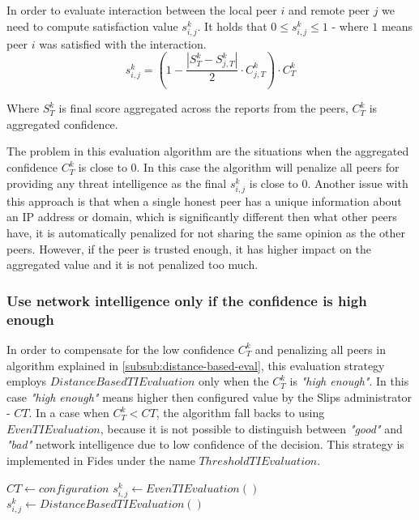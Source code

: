 In order to evaluate interaction between the local peer $i$ and remote peer $j$ we need to compute satisfaction value $s^{k}_{i, j}$. 
It holds that  $0 \leq s^{k}_{i, j} \leq 1$ - where $1$ means peer $i$ was satisfied with the interaction.
\begin{equation}
s^{k}_{i, j} = (1 - \frac{|{S}^{k}_{T} - S^{k}_{j, T}|}{2} \cdot C^{k}_{j, T}) \cdot C^{k}_{T}
\end{equation}

Where $S^{k}_{T}$ is final score aggregated across the reports from the peers, $C^{k}_{T}$ is aggregated confidence.

The problem in this evaluation algorithm are the situations when the aggregated confidence $C^{k}_{T}$ is close to $0$. In this case the algorithm will penalize all peers for providing any threat intelligence as the final $s^{k}_{i, j}$ is close to $0$. Another issue with this approach is that when a single honest peer has a unique information about an IP address or domain, which is significantly different then what other peers have, it is automatically penalized for not sharing the same opinion as the other peers. However, if the peer is trusted enough, it has higher impact on the aggregated value and it is not penalized too much.

\subsubsection{Use network intelligence only if the confidence is high enough}
In order to compensate for the low confidence $C^{k}_{T}$ and penalizing all peers in algorithm explained in \ref{subsub:distance-based-eval}, this evaluation strategy employs $DistanceBasedTIEvaluation$ only when the $C^{k}_{T}$ is \textit{"high enough"}. In this case \textit{"high enough"} means higher then configured value by the Slips administrator - ${CT}$. In a case when  $C^{k}_{T} < {CT}$, the algorithm fall backs to using $EvenTIEvaluation$, because it is not possible to distinguish between \textit{"good"} and \textit{"bad"} network intelligence due to low confidence of the decision. This strategy is implemented in Fides under the name $ThresholdTIEvaluation$.
\begin{algorithm}
\caption{$ThresholdTIEvaluation$}\label{alg:threshold-ti-evaluation}
\begin{algorithmic}[1]
\State ${CT} \gets configuration$ 
	\State $s^{k}_{i, j} \gets EvenTIEvaluation()$
\Else
    \State $s^{k}_{i, j} \gets DistanceBasedTIEvaluation()$
\EndIf
\end{algorithmic}
\end{algorithm}

